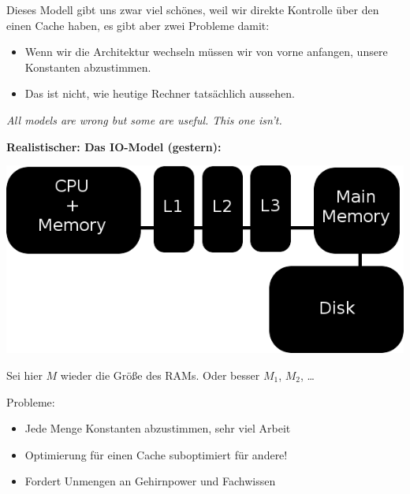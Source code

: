 \documentclass{beamer}
\begin{document}

\begin{frame}

Dieses Modell gibt uns zwar viel schönes, weil wir direkte Kontrolle über den einen Cache haben, es gibt aber zwei Probleme damit:\pause

\begin{itemize}
\item Wenn wir die Architektur wechseln müssen wir von vorne anfangen, unsere Konstanten abzustimmen.\pause
\item Das ist nicht, wie heutige Rechner tatsächlich aussehen.\pause
\end{itemize}
\bigskip

\begin{center}
\emph{All models are wrong but some are useful. This one isn't.}
\end{center}
\end{frame}


\begin{frame}
\textbf{Realistischer: Das IO-Model (\glqq gestern\grqq):}

\begin{center}
\includegraphics[scale=0.325]{model2.png} 
\end{center}
Sei hier $M$ wieder die Größe des RAMs. Oder besser $M_1$, $M_2$, \dots\smallskip\smallskip
\pause

Probleme:
\begin{itemize}
\item Jede Menge Konstanten abzustimmen, sehr viel Arbeit\pause
\item Optimierung für einen Cache suboptimiert für andere!\pause
\item Fordert Unmengen an Gehirnpower und Fachwissen 
\end{itemize}
\end{frame}
\end{document}
